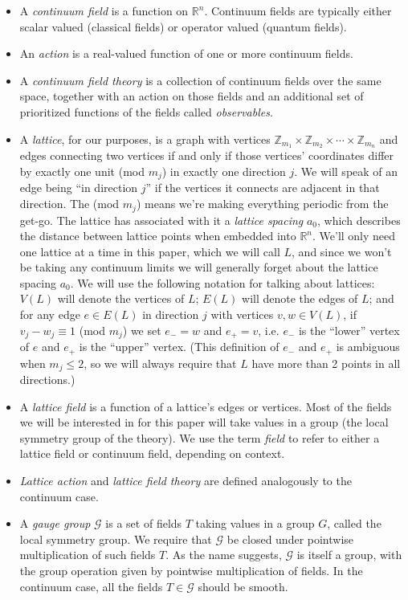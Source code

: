 \documentclass[9pt,twocolumn,twoside]{article}
\begin{document}
\begin{itemize}
\item A \textit{continuum field} is a function on $\mathbb{R}^n$.  Continuum fields are typically either scalar valued (classical fields) or operator valued (quantum fields).
\item An \textit{action} is a real-valued function of one or more continuum fields.
\item A \textit{continuum field theory} is a collection of continuum fields over the same space, together with an action on those fields and an additional set of prioritized functions of the fields called \textit{observables}.
\item A \textit{lattice}, for our purposes, is a graph with vertices $\mathbb{Z}_{m_1}\times\mathbb{Z}_{m_2}\times \cdots \times \mathbb{Z}_{m_n}$ and edges connecting two vertices if and only if those vertices' coordinates differ by exactly one unit (mod $m_j$) in exactly one direction $j$.  We will speak of an edge being ``in direction $j$'' if the vertices it connects are adjacent in that direction.  The (mod $m_j$) means we're making everything periodic from the get-go.  The lattice has associated with it a \textit{lattice spacing} $a_0$, which describes the distance between lattice points when embedded into $\mathbb{R}^n$.  We'll only need one lattice at a time in this paper, which we will call $L$, and since we won't be taking any continuum limits we will generally forget about the lattice spacing $a_0$.  We will use the following notation for talking about lattices: $V(L)$ will denote the vertices of $L$; $E(L)$ will denote the edges of $L$; and for any edge $e\in E(L)$ in direction $j$ with vertices $v,w\in V(L)$, if $v_j-w_j\equiv 1$ (mod $m_j$) we set $e_- = w$ and $e_+ = v$, i.e. $e_-$ is the ``lower'' vertex of $e$ and $e_+$ is the ``upper'' vertex.  (This definition of $e_-$ and $e_+$ is ambiguous when $m_j\leq 2$, so we will always require that $L$ have more than 2 points in all directions.)
\item A \textit{lattice field} is a function of a lattice's edges or vertices.  Most of the fields we will be interested in for this paper will take values in a group (the local symmetry group of the theory).  We use the term \textit{field} to refer to either a lattice field or continuum field, depending on context.
\item \textit{Lattice action} and \textit{lattice field theory} are defined analogously to the continuum case. 
\item A \textit{gauge group} $\mathcal{G}$ is a set of fields $T$ taking values in a group $G$, called the local symmetry group.  We require that $\mathcal{G}$ be closed under pointwise multiplication of such fields $T$.  As the name suggests, $\mathcal{G}$ is itself a group, with the group operation given by pointwise multiplication of fields.  In the continuum case, all the fields $T\in\mathcal{G}$ should be smooth.

\end{itemize}
\end{document}
